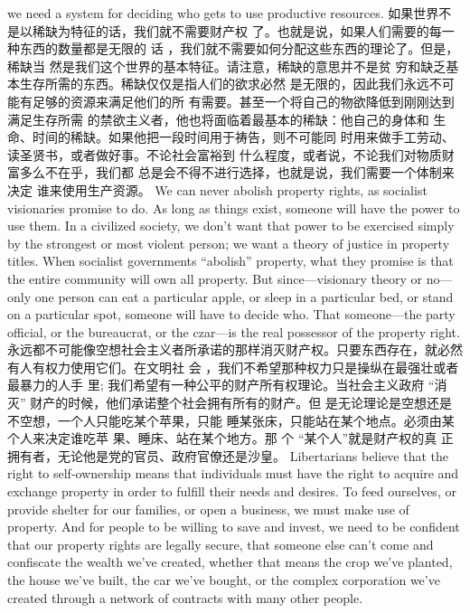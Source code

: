 \begin{paracol}{2}
we need a system for deciding who gets to use productive resources.
\switchcolumn
如果世界不是以稀缺为特征的话，我们就不需要财产权
了。也就是说，如果人们需要的每一种东西的数量都是无限的
话 ，我们就不需要如何分配这些东西的理论了。但是，稀缺当
然是我们这个世界的基本特征。请注意，稀缺的意思并不是贫
穷和缺乏基本生存所需的东西。稀缺仅仅是指人们的欲求必然
是无限的，因此我们永远不可能有足够的资源来满足他们的所
有需要。甚至一个将自己的物欲降低到刚刚达到满足生存所需
的禁欲主义者，他也将面临着最基本的稀缺：他自己的身体和
生命、时间的稀缺。如果他把一段时间用于祷告，则不可能同
时用来做手工劳动、读圣贤书，或者做好事。不论社会富裕到
什么程度，或者说，不论我们对物质财富多么不在乎，我们都
总是会不得不进行选择，也就是说，我们需要一个体制来决定
谁来使用生产资源。
\switchcolumn*
We can never abolish property rights, as socialist visionaries
promise to do. As long as things exist, someone will have the
power to use them. In a civilized society, we don't want that
power to be exercised simply by the strongest or most violent
person; we want a theory of justice in property titles. When socialist governments ``abolish'' property, what they promise is
that the entire community will own all property. But since---visionary theory or no---only one person can eat a particular
apple, or sleep in a particular bed, or stand on a particular spot,
someone will have to decide who. That someone---the party official, or the bureaucrat, or the czar---is the real possessor of the property right.
\switchcolumn
永远都不可能像空想社会主义者所承诺的那样消灭财产权。只要东西存在，就必然有人有权力使用它们。在文明社
会 ，我们不希望那种权力只是操纵在最强壮或者最暴力的人手
里; 我们希望有一种公平的财产所有权理论。当社会主义政府
“消灭” 财产的时候，他们承诺整个社会拥有所有的财产。但
是无论理论是空想还是不空想，一个人只能吃某个苹果，只能
睡某张床，只能站在某个地点。必须由某个人来决定谁吃苹
果、睡床、站在某个地方。那 个 “某个人”就是财产权的真
正拥有者，无论他是党的官员、政府官僚还是沙皇。
\switchcolumn*
Libertarians believe that the right to self-ownership means
that individuals must have the right to acquire and exchange
property in order to fulfill their needs and desires. To feed ourselves, or provide shelter for our families, or open a business, we
must make use of property. And for people to be willing to save
and invest, we need to be confident that our property rights are
legally secure, that someone else can't come and confiscate the
wealth we've created, whether that means the crop we've
planted, the house we've built, the car we've bought, or the
complex corporation we've created through a network of contracts with many other people.

\end{paracol}
